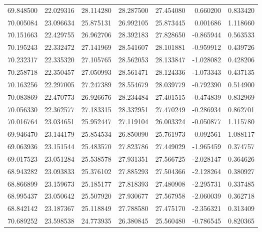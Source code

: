 \begin{tabular}{rrrrrrr}
 69.848500 &  22.029316 &         28.114280 &         28.287500 &         27.454080 &  0.660200 &  0.833420 \\
 70.005084 &  23.096634 &         25.875131 &         26.992105 &         25.873445 &  0.001686 &  1.118660 \\
 70.151663 &  22.429755 &         26.962706 &         28.392183 &         27.828650 & -0.865944 &  0.563533 \\
 70.195243 &  22.332472 &         27.141969 &         28.541607 &         28.101881 & -0.959912 &  0.439726 \\
 70.232317 &  22.335320 &         27.105765 &         28.562053 &         28.133847 & -1.028082 &  0.428206 \\
 70.258718 &  22.350457 &         27.050993 &         28.561471 &         28.124336 & -1.073343 &  0.437135 \\
 70.163256 &  22.297005 &         27.247389 &         28.554679 &         28.039779 & -0.792390 &  0.514900 \\
 70.083869 &  22.470773 &         26.926676 &         28.234484 &         27.401515 & -0.474839 &  0.832969 \\
 70.056330 &  22.362577 &         27.183315 &         28.332951 &         27.470249 & -0.286934 &  0.862701 \\
 70.016764 &  23.034651 &         25.952447 &         27.119104 &         26.003324 & -0.050877 &  1.115780 \\
 69.946470 &  23.144179 &         25.854534 &         26.850090 &         25.761973 &  0.092561 &  1.088117 \\
 69.063936 &  23.151544 &         25.483570 &         27.823786 &         27.449029 & -1.965459 &  0.374757 \\
 69.017523 &  23.051284 &         25.538578 &         27.931351 &         27.566725 & -2.028147 &  0.364626 \\
 68.943282 &  23.093833 &         25.376102 &         27.885293 &         27.504366 & -2.128264 &  0.380927 \\
 68.866899 &  23.159673 &         25.185177 &         27.818393 &         27.480908 & -2.295731 &  0.337485 \\
 68.995437 &  23.050642 &         25.507920 &         27.930677 &         27.567958 & -2.060039 &  0.362718 \\
 68.842142 &  23.187367 &         25.118849 &         27.788580 &         27.475170 & -2.356321 &  0.313409 \\
 70.689252 &  23.598538 &         24.773935 &         26.380845 &         25.560480 & -0.786545 &  0.820365 \\

\end{tabular}
